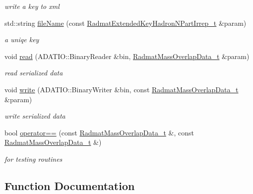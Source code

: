 \begin{DoxyCompactItemize}
\begin{DoxyCompactList}\small\item\em write a key to xml \end{DoxyCompactList}\item 
std\+::string \mbox{\hyperlink{namespaceradmat_a29507df1342906351184fb8d4e1bb16a}{file\+Name}} (const \mbox{\hyperlink{structradmat_1_1RadmatExtendedKeyHadronNPartIrrep__t}{Radmat\+Extended\+Key\+Hadron\+N\+Part\+Irrep\+\_\+t}} \&param)
\begin{DoxyCompactList}\small\item\em a uniqe key \end{DoxyCompactList}\item 
void \mbox{\hyperlink{namespaceradmat_a48bba8fb1d24a49efdc5eed962710717}{read}} (A\+D\+A\+T\+I\+O\+::\+Binary\+Reader \&bin, \mbox{\hyperlink{structradmat_1_1RadmatMassOverlapData__t}{Radmat\+Mass\+Overlap\+Data\+\_\+t}} \&param)
\begin{DoxyCompactList}\small\item\em read serialized data \end{DoxyCompactList}\item 
void \mbox{\hyperlink{namespaceradmat_a47d088d360c723c8981b3ef1ed8da405}{write}} (A\+D\+A\+T\+I\+O\+::\+Binary\+Writer \&bin, const \mbox{\hyperlink{structradmat_1_1RadmatMassOverlapData__t}{Radmat\+Mass\+Overlap\+Data\+\_\+t}} \&param)
\begin{DoxyCompactList}\small\item\em write serialized data \end{DoxyCompactList}\item 
bool \mbox{\hyperlink{namespaceradmat_a33c106e5957a1e9d566afd6012f2d87e}{operator==}} (const \mbox{\hyperlink{structradmat_1_1RadmatMassOverlapData__t}{Radmat\+Mass\+Overlap\+Data\+\_\+t}} \&, const \mbox{\hyperlink{structradmat_1_1RadmatMassOverlapData__t}{Radmat\+Mass\+Overlap\+Data\+\_\+t}} \&)
\begin{DoxyCompactList}\small\item\em for testing routines \end{DoxyCompactList}\end{DoxyCompactItemize}


\subsection{Function Documentation}
\mbox{\label{namespaceradmat_a29507df1342906351184fb8d4e1bb16a}} 
